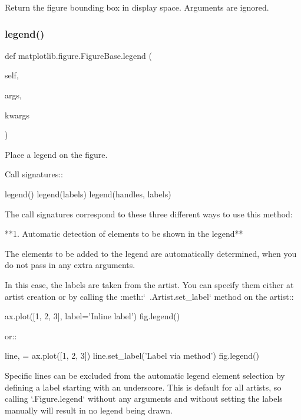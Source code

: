 \begin{DoxyVerb}
\begin{DoxyVerb}
\begin{DoxyVerb}Return the figure bounding box in display space. Arguments are ignored.
\end{DoxyVerb}
 \mbox{\label{classmatplotlib_1_1figure_1_1FigureBase_a73aa2a9491580c5b8bb6add11076b0a8}} 
\subsubsection{\texorpdfstring{legend()}{legend()}}
{\footnotesize\ttfamily def matplotlib.\+figure.\+Figure\+Base.\+legend (\begin{DoxyParamCaption}\item[{}]{self,  }\item[{}]{args,  }\item[{}]{kwargs }\end{DoxyParamCaption})}

\begin{DoxyVerb}Place a legend on the figure.

Call signatures::

    legend()
    legend(labels)
    legend(handles, labels)

The call signatures correspond to these three different ways to use
this method:

**1. Automatic detection of elements to be shown in the legend**

The elements to be added to the legend are automatically determined,
when you do not pass in any extra arguments.

In this case, the labels are taken from the artist. You can specify
them either at artist creation or by calling the
:meth:`~.Artist.set_label` method on the artist::

    ax.plot([1, 2, 3], label='Inline label')
    fig.legend()

or::

    line, = ax.plot([1, 2, 3])
    line.set_label('Label via method')
    fig.legend()

Specific lines can be excluded from the automatic legend element
selection by defining a label starting with an underscore.
This is default for all artists, so calling `.Figure.legend` without
any arguments and without setting the labels manually will result in
no legend being drawn.



\end{DoxyVerb}
\end{DoxyVerb}
\end{DoxyVerb}
